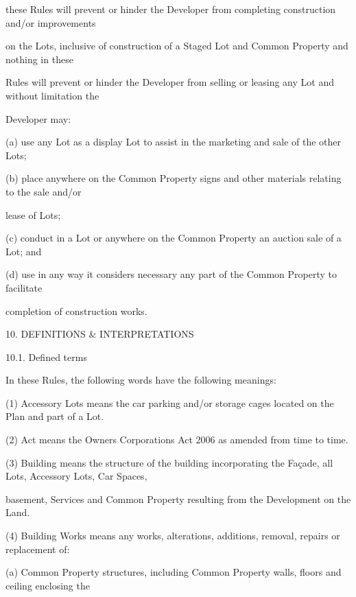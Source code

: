 \documentclass{article}
\begin{document}
{\fontsize{10.02}{1}these Rules will prevent or hinder the Developer from completing construction and/or improvements }

{\fontsize{10.02}{1}on the Lots, inclusive of construction of a Staged Lot and Common Property and nothing in these }

{\fontsize{10.02}{1}Rules will prevent or hinder the Developer from selling or leasing any Lot and without limitation the }

{\fontsize{10.02}{1}Developer may: }

{\fontsize{9.962}{1}(a) use any Lot as a display Lot to assist in the marketing and sale of the other Lots; }

{\fontsize{9.962}{1}(b) place anywhere on the Common Property signs and other materials relating to the sale and/or }

{\fontsize{10.02}{1}lease of Lots; }

{\fontsize{9.962}{1}(c) conduct in a Lot or anywhere on the Common Property an auction sale of a Lot; and }

{\fontsize{9.962}{1}(d) use in any way it considers necessary any part of the Common Property to facilitate }

{\fontsize{10.02}{1}completion of construction works. }


{\fontsize{9.99}{1}10. DEFINITIONS \& INTERPRETATIONS }

{\fontsize{9.99}{1}10.1. Defined terms }

{\fontsize{10.02}{1}In these Rules, the following words have the following meanings: }

{\fontsize{9.962}{1}(1) Accessory Lots means the car parking and/or storage cages located on the Plan and part of a Lot. }

{\fontsize{9.962}{1}(2) Act means the Owners Corporations Act 2006 as amended from time to time. }

{\fontsize{9.962}{1}(3) Building means the structure of the building incorporating the Façade, all Lots, Accessory Lots, Car Spaces, }

{\fontsize{10.02}{1}basement, Services and Common Property resulting from the Development on the Land.  }

{\fontsize{9.962}{1}(4) Building Works means any works, alterations, additions, removal, repairs or replacement of: }

{\fontsize{9.962}{1}(a) Common Property structures, including Common Property walls, floors and ceiling enclosing the }
\end{document}

